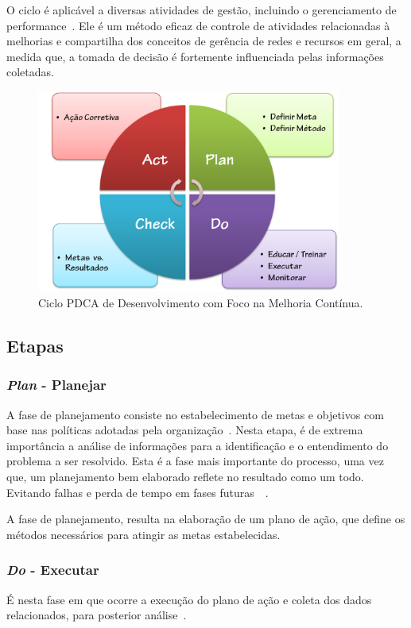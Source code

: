 O ciclo é aplicável a diversas atividades de gestão, incluindo o gerenciamento de performance~\cite{pdcacont}. Ele é um método eficaz de controle de atividades relacionadas à melhorias e compartilha dos conceitos de gerência de redes e recursos em geral, a medida que, a tomada de decisão é fortemente influenciada pelas informações coletadas.


\begin{figure}[htp]
\centering
\includegraphics[width=10cm]{chapters/chapter2/pdca_cycle.png}
\caption[Ciclo PDCA]{Ciclo PDCA de Desenvolvimento com Foco na Melhoria Contínua.}
\label{fig:pdca}
\end{figure}


\subsection{Etapas}
\label{pdca:phases}
\subsubsection{\textit{Plan} - Planejar}
A fase de planejamento consiste no estabelecimento de metas e objetivos com base nas políticas adotadas pela organização~\cite{pdcacont}. Nesta etapa, é de extrema importância a análise de informações para a identificação e o entendimento do problema a ser resolvido. Esta é a fase mais importante do processo, uma vez que, um planejamento bem elaborado reflete no resultado como um todo. Evitando falhas e perda de tempo em fases futuras~\cite{fabio2003}~\cite{pdcacont}.

A fase de planejamento, resulta na elaboração de um plano de ação, que define os métodos necessários para atingir as metas estabelecidas.

\subsubsection{\textit{Do} - Executar}
É nesta fase em que ocorre a execução do plano de ação e coleta dos dados relacionados, para posterior análise~\cite{pdcacont}.

